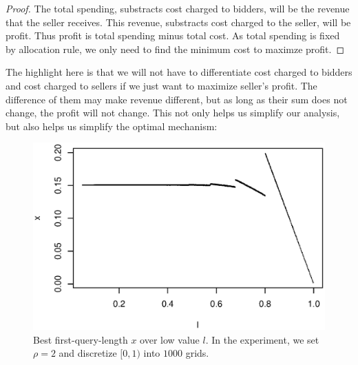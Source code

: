 \begin{proof}
The total spending, substracts cost charged to bidders, will be the revenue
that the seller receives.  This revenue, substracts cost charged to the seller,
will be profit. Thus profit is total spending minus total cost. As total
spending is fixed by allocation rule, we only need to find the minimum cost to
maximze profit.
\end{proof}

The highlight here is that we will not have to differentiate cost charged to
bidders and cost charged to sellers if we just want to maximize seller's profit.
The difference of them may make revenue different, but as long as their sum
does not change, the profit will not change. This not only helps us simplify our
analysis, but also helps us simplify the optimal mechanism: 


\begin{figure}
    \includegraphics[trim=0mm 5mm 5mm 15mm, clip, width=\linewidth]{figures/10000-500-2-1-10}
    \caption{Best first-query-length $x$ over low value $l$. In the experiment, 
    we set $\rho=2$ and discretize $[0,1)$ into $1000$ grids.}
    \label{fig:x-l}
\end{figure}

